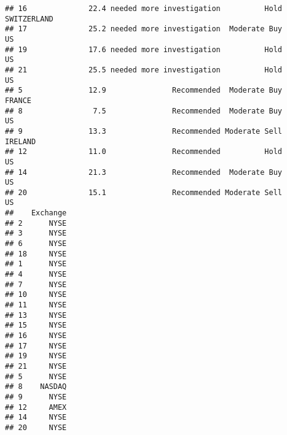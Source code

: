 \documentclass[
]{article}
\begin{document}
\begin{verbatim}
## 16              22.4 needed more investigation          Hold SWITZERLAND
## 17              25.2 needed more investigation  Moderate Buy          US
## 19              17.6 needed more investigation          Hold          US
## 21              25.5 needed more investigation          Hold          US
## 5               12.9               Recommended  Moderate Buy      FRANCE
## 8                7.5               Recommended  Moderate Buy          US
## 9               13.3               Recommended Moderate Sell     IRELAND
## 12              11.0               Recommended          Hold          US
## 14              21.3               Recommended  Moderate Buy          US
## 20              15.1               Recommended Moderate Sell          US
##    Exchange
## 2      NYSE
## 3      NYSE
## 6      NYSE
## 18     NYSE
## 1      NYSE
## 4      NYSE
## 7      NYSE
## 10     NYSE
## 11     NYSE
## 13     NYSE
## 15     NYSE
## 16     NYSE
## 17     NYSE
## 19     NYSE
## 21     NYSE
## 5      NYSE
## 8    NASDAQ
## 9      NYSE
## 12     AMEX
## 14     NYSE
## 20     NYSE
\end{verbatim}
\end{document}
